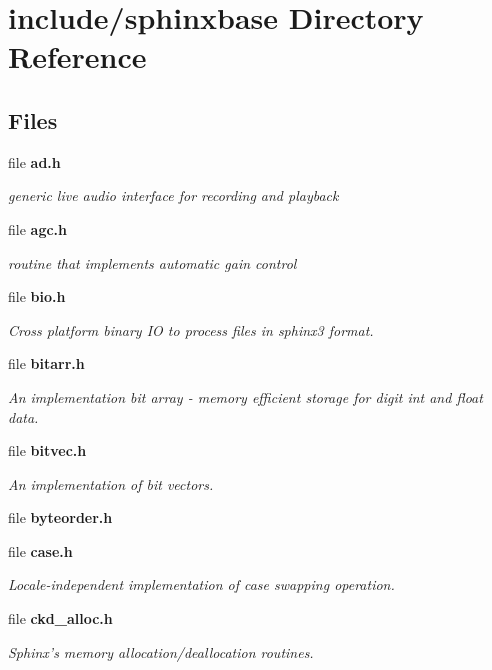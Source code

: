 \section{include/sphinxbase Directory Reference}
\label{dir_e3d154c296a8e9be2797a4f81e9375b2}
\subsection*{Files}
\begin{DoxyCompactItemize}
\item 
file {\bf ad.\-h}
\begin{DoxyCompactList}\small\item\em generic live audio interface for recording and playback \end{DoxyCompactList}\item 
file {\bf agc.\-h}
\begin{DoxyCompactList}\small\item\em routine that implements automatic gain control \end{DoxyCompactList}\item 
file {\bf bio.\-h}
\begin{DoxyCompactList}\small\item\em Cross platform binary I\-O to process files in sphinx3 format. \end{DoxyCompactList}\item 
file {\bf bitarr.\-h}
\begin{DoxyCompactList}\small\item\em An implementation bit array -\/ memory efficient storage for digit int and float data. \end{DoxyCompactList}\item 
file {\bf bitvec.\-h}
\begin{DoxyCompactList}\small\item\em An implementation of bit vectors. \end{DoxyCompactList}\item 
file {\bfseries byteorder.\-h}
\item 
file {\bf case.\-h}
\begin{DoxyCompactList}\small\item\em Locale-\/independent implementation of case swapping operation. \end{DoxyCompactList}\item 
file {\bf ckd\-\_\-alloc.\-h}
\begin{DoxyCompactList}\small\item\em Sphinx's memory allocation/deallocation routines. \end{DoxyCompactList}\item 

\end{DoxyCompactItemize}
